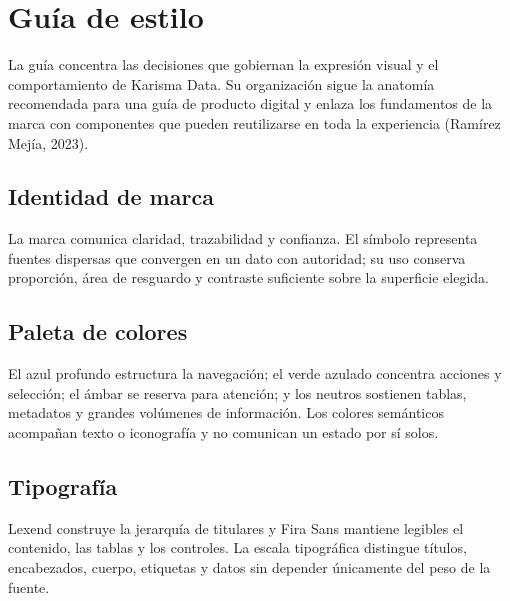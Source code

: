 \section{Guía de estilo}

La guía concentra las decisiones que gobiernan la expresión visual y el comportamiento de
Karisma Data. Su organización sigue la anatomía recomendada para una guía de producto digital
y enlaza los fundamentos de la marca con componentes que pueden reutilizarse en toda la
experiencia (Ramírez Mejía, 2023).

\subsection{Identidad de marca}

La marca comunica claridad, trazabilidad y confianza. El símbolo representa fuentes dispersas
que convergen en un dato con autoridad; su uso conserva proporción, área de resguardo y
contraste suficiente sobre la superficie elegida.


\subsection{Paleta de colores}

El azul profundo estructura la navegación; el verde azulado concentra acciones y selección;
el ámbar se reserva para atención; y los neutros sostienen tablas, metadatos y grandes
volúmenes de información. Los colores semánticos acompañan texto o iconografía y no comunican
un estado por sí solos.


\subsection{Tipografía}

Lexend construye la jerarquía de titulares y Fira Sans mantiene legibles el contenido, las
tablas y los controles. La escala tipográfica distingue títulos, encabezados, cuerpo,
etiquetas y datos sin depender únicamente del peso de la fuente.


